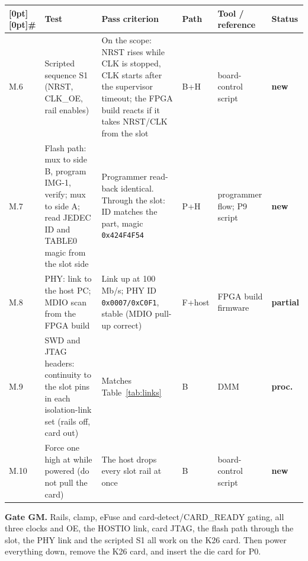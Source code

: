 \documentclass[10pt,a4paper]{article}
\newcommand\PA{\textcolor{amber}{\textbf{partial}}}
\newcommand\NW{\textcolor{warn}{\textbf{new}}}
\newcommand\PR{\textcolor{srcgray}{\textbf{proc.}}}
\newcommand\hd[1]{\textbf{#1}}
\newcommand\phasehead{\toprule
  \rowcolor{headgray}[0pt][0pt]\hd{\#} & \hd{Test} & \hd{Pass criterion} & \hd{Path} & \hd{Tool / reference} & \hd{Status}\\
  \midrule}
\newcommand\phasebegin{\par\noindent\begingroup\footnotesize\setlength{\tabcolsep}{4pt}\renewcommand{\arraystretch}{1.22}}
\newcommand\phaseend{\endgroup\par\medskip}
\renewcommand{\arraystretch}{1.18}
\begin{document}
\phasebegin\begin{tabularx}{\textwidth}{@{}P{0.75cm}LP{4.7cm}C{0.95cm}P{3.3cm}C{1.05cm}@{}}\phasehead
M.6 & Scripted sequence S1 (NRST, CLK\_OE, rail enables) & On the scope: NRST rises while CLK is stopped, CLK starts after the supervisor timeout; the FPGA build reacts if it takes NRST/CLK from the slot & B+H & board-control script & \NW \\
M.7 & Flash path: mux to side B, program IMG-1, verify; mux to side A; read JEDEC ID and TABLE0 magic from the slot side & Programmer read-back identical. Through the slot: ID matches the part, magic \texttt{0x424F4F54} & P+H & programmer flow; P9 script & \NW \\
M.8 & PHY: link to the host PC; MDIO scan from the FPGA build & Link up at 100\,Mb/s; PHY ID \texttt{0x0007/0xC0F1}, stable (MDIO pull-up correct) & F+host & FPGA build firmware & \PA \\
M.9 & SWD and JTAG headers: continuity to the slot pins in each isolation-link set (rails off, card out) & Matches Table~\ref{tab:links} & B & DMM & \PR \\
M.10 & Force one  high at  while powered (do not pull the card) & The host drops every slot rail at once & B & board-control script & \NW \\
\bottomrule\end{tabularx}\phaseend
\begin{gatebox}\textbf{Gate GM.} Rails, clamp, eFuse and card-detect/CARD\_READY gating, all three clocks and OE, the HOSTIO link, card JTAG, the flash path through the slot, the PHY link and the scripted S1 all work on the K26 card. Then power everything down, remove the K26 card, and insert the die card for P0.\end{gatebox}
\end{document}
